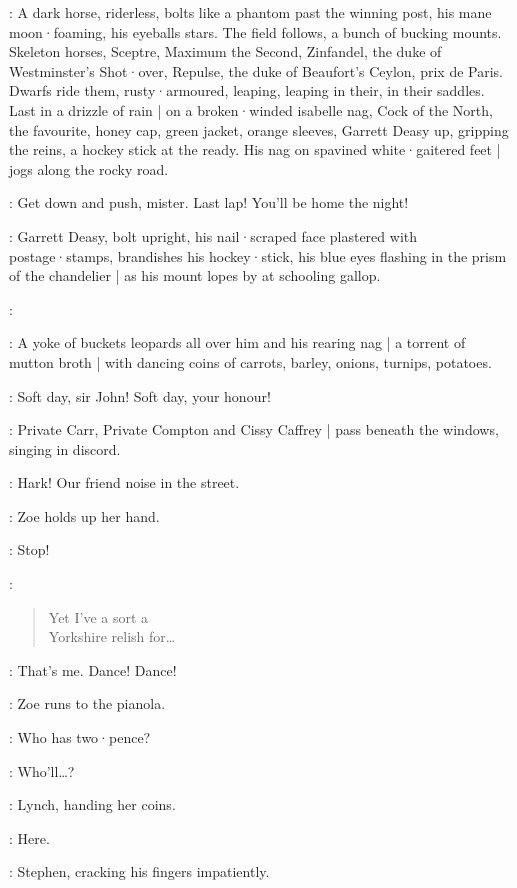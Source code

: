 :
A dark horse,
riderless,
bolts like a phantom past the winning post,
his mane moon·foaming,
his eyeballs stars.
The field follows,
a bunch of bucking mounts.
Skeleton horses,
Sceptre,
Maximum the Second,
Zinfandel,
the duke of Westminster's Shot·over,
Repulse,
the duke of Beaufort's Ceylon,
prix de Paris.
Dwarfs ride them,
rusty·armoured,
leaping,
leaping in their,
in their saddles.
Last in a drizzle of rain |
on a broken·winded isabelle nag,
%
Cock of the North,
the favourite,
honey cap,
green jacket,
orange sleeves,
Garrett Deasy up,
gripping the reins,
a hockey stick at the ready.
His nag on spavined white·gaitered feet |
jogs along the rocky road.

\OrangeLodges[2]:
Get down and push,
mister.
Last lap!
You'll be home the night!

:
Garrett Deasy,
bolt upright,
his nail·scraped face plastered with postage·stamps,
brandishes his hockey·stick,
his blue eyes flashing in the prism of the chandelier |
as his mount lopes by at schooling gallop.

\GarrettDeasy:

:
A yoke of buckets leopards all over him and his rearing nag |
%
a torrent of mutton broth |
with dancing coins
of carrots,
barley,
onions,
turnips,
potatoes.

\GreenLodges[2]:
Soft day,
sir John!
Soft day,
your honour!

:
Private Carr,
Private Compton
and Cissy Caffrey |
pass beneath the windows,
singing in discord.

\Stephen:
Hark!
Our friend noise in the street.

:
Zoe holds up her hand.

\Zoe:
Stop!

\CarrComptonCissy[2]:
\begin{verse}
    Yet I've a sort a\\
    Yorkshire relish for…
\end{verse}

\Zoe:
That's me.
Dance!
Dance!

:
Zoe runs to the pianola.

\Zoe:
Who has two·pence?

\Bloom:
Who'll…?

:
Lynch,
handing her coins.

\Lynch:
Here.

:
Stephen,
cracking his fingers impatiently.

